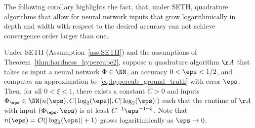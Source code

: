 \documentclass{amsart}[11pt]
\numberwithin{equation}{section}
\newcommand{\order}{\mathcal{O}}
\numberwithin{theorem}{section}
\begin{document}
The following corollary highlights the fact, that, under SETH, quadrature algorithms that allow for neural network inputs that grow logarithmically in depth and width with respect to the desired accuracy can not achieve convergence order larger than one.

\begin{corollary}\label{cor:eps_hardness_hypercube_low}
    Under SETH (Assumption~\ref{ass:SETH}) and the assumptions of Theorem~\ref{thm:hardness_hypercube2}, suppose a quadrature algorithm $\AA$ that takes as input a neural network $\Phi \in \NN$, an accuracy $0 < \eps < 1/2$, and computes an approximation to~\eqref{eq:hypercub_ground_truth} with error $\eps$. Then, for all $0 < \xi < 1$, there exists a constant $C > 0$ and inputs $\Phi_\eps\in \NN(n(\eps),C |\log_2(\eps)|, C |\log_2(\eps)|)$ such that the runtime of $\AA$ with input $(\Phi_\eps,\eps)$ is at least $C^{-1} \eps^{-1+\xi}$. Note that
    $n(\eps) = \order(|\log_2(\eps)| + 1)$ grows logarithmically as $\eps \to 0$. 
\end{corollary}
\end{document}
